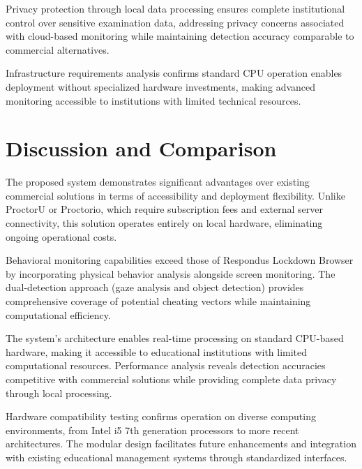 \documentclass[conference]{IEEEtran}
\begin{document}
Privacy protection through local data processing ensures complete institutional control 
over sensitive examination data, addressing privacy concerns associated with cloud-based 
monitoring while maintaining detection accuracy comparable to commercial alternatives.

Infrastructure requirements analysis confirms standard CPU operation enables deployment 
without specialized hardware investments, making advanced monitoring accessible to institutions 
with limited technical resources.

\section{Discussion and Comparison}

The proposed system demonstrates significant advantages over existing commercial solutions 
in terms of accessibility and deployment flexibility. Unlike ProctorU or Proctorio, which 
require subscription fees and external server connectivity\cite{proctoru}\cite{proctorio}, 
this solution operates entirely on local hardware, eliminating ongoing operational costs.

Behavioral monitoring capabilities exceed those of Respondus Lockdown Browser by incorporating 
physical behavior analysis alongside screen monitoring\cite{respondus}. The dual-detection 
approach (gaze analysis and object detection) provides comprehensive coverage of potential 
cheating vectors while maintaining computational efficiency.

The system's architecture enables real-time processing on standard CPU-based hardware, 
making it accessible to educational institutions with limited computational resources. 
Performance analysis reveals detection accuracies competitive with commercial solutions 
while providing complete data privacy through local processing.

Hardware compatibility testing confirms operation on diverse computing environments, 
from Intel i5 7th generation processors to more recent architectures. The modular 
design facilitates future enhancements and integration with existing educational 
management systems through standardized interfaces.
\end{document}
